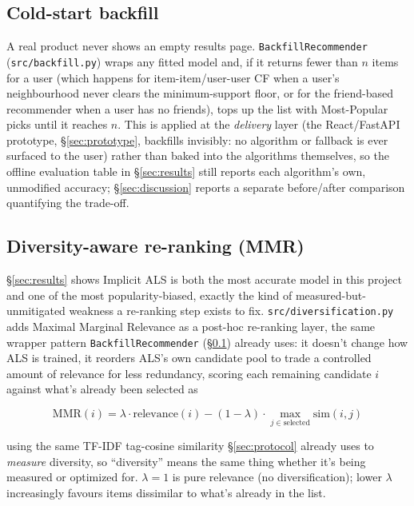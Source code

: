 \documentclass[11pt,a4paper]{article}
\newcommand{\code}[1]{\texttt{#1}}
\newcommand{\secref}[1]{\S\ref{#1}}
\begin{document}
\subsection{Cold-start backfill}
\label{sec:backfill}

A real product never shows an empty results page. \code{BackfillRecommender} (\code{src/backfill.py}) wraps any fitted model and, if it returns fewer than $n$ items for a user (which happens for item-item/user-user CF when a user's neighbourhood never clears the minimum-support floor, or for the friend-based recommender when a user has no friends), tops up the list with Most-Popular picks until it reaches $n$. This is applied at the \emph{delivery} layer (the React/FastAPI prototype, \secref{sec:prototype}, backfills invisibly: no algorithm or fallback is ever surfaced to the user) rather than baked into the algorithms themselves, so the offline evaluation table in \secref{sec:results} still reports each algorithm's own, unmodified accuracy; \secref{sec:discussion} reports a separate before/after comparison quantifying the trade-off.

\subsection{Diversity-aware re-ranking (MMR)}
\label{sec:mmr}

\secref{sec:results} shows Implicit ALS is both the most accurate model in this project and one of the most popularity-biased, exactly the kind of measured-but-unmitigated weakness a re-ranking step exists to fix. \code{src/diversification.py} adds Maximal Marginal Relevance \citep{carbonell1998mmr} as a post-hoc re-ranking layer, the same wrapper pattern \code{BackfillRecommender} (\secref{sec:backfill}) already uses: it doesn't change how ALS is trained, it reorders ALS's own candidate pool to trade a controlled amount of relevance for less redundancy, scoring each remaining candidate $i$ against what's already been selected as

\begin{equation}
\text{MMR}(i) = \lambda \cdot \text{relevance}(i) - (1-\lambda) \cdot \max_{j \in \text{selected}} \text{sim}(i,j)
\end{equation}

using the same TF-IDF tag-cosine similarity \secref{sec:protocol} already uses to \emph{measure} diversity, so ``diversity'' means the same thing whether it's being measured or optimized for. $\lambda = 1$ is pure relevance (no diversification); lower $\lambda$ increasingly favours items dissimilar to what's already in the list.
\end{document}
